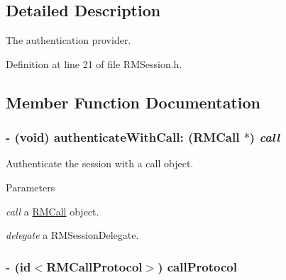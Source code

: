 \subsection{Detailed Description}
The authentication provider. 

Definition at line 21 of file RMSession.h.

\subsection{Member Function Documentation}
\hypertarget{protocol_r_m_authenticator-p_acec2e6c190f5719f5e9184938e50aa43}{
\subsubsection[{authenticateWithCall:}]{\setlength{\rightskip}{0pt plus 5cm}-\/ (void) authenticateWithCall: ({\bf RMCall} $\ast$) {\em call}}}
\label{protocol_r_m_authenticator-p_acec2e6c190f5719f5e9184938e50aa43}


Authenticate the session with a call object. 
\begin{DoxyParams}{Parameters}
\item[{\em call}]a \hyperlink{interface_r_m_call}{RMCall} object. \item[{\em delegate}]a RMSessionDelegate. \end{DoxyParams}
\hypertarget{protocol_r_m_authenticator-p_a1a8ee1ab6eb4014dd3783e096173f000}{
\subsubsection[{callProtocol}]{\setlength{\rightskip}{0pt plus 5cm}-\/ (id$<${\bf RMCallProtocol}$>$) callProtocol }}
\label{protocol_r_m_authenticator-p_a1a8ee1ab6eb4014dd3783e096173f000}



